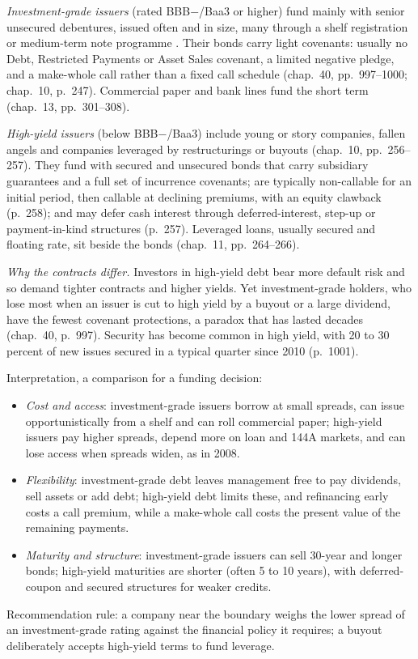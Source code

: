 \begin{qfmethod}\label{meth:corporate-funding-ig-hy}
 \emph{Investment-grade issuers} (rated BBB$-$/Baa3 or higher) fund mainly with senior unsecured debentures, issued often and in size, many through a shelf registration or medium-term note programme \citep[chap.~10, pp.~252 and~259--260]{s7-fabozzifixed}. Their bonds carry light covenants: usually no Debt, Restricted Payments or Asset Sales covenant, a limited negative pledge, and a make-whole call rather than a fixed call schedule (chap.~40, pp.~997--1000; chap.~10, p.~247). Commercial paper and bank lines fund the short term (chap.~13, pp.~301--308).

\emph{High-yield issuers} (below BBB$-$/Baa3) include young or story companies, fallen angels and companies leveraged by restructurings or buyouts (chap.~10, pp.~256--257). They fund with secured and unsecured bonds that carry subsidiary guarantees and a full set of incurrence covenants; are typically non-callable for an initial period, then callable at declining premiums, with an equity clawback (p.~258); and may defer cash interest through deferred-interest, step-up or payment-in-kind structures (p.~257). Leveraged loans, usually secured and floating rate, sit beside the bonds (chap.~11, pp.~264--266).

 \emph{Why the contracts differ.} Investors in high-yield debt bear more default risk and so demand tighter contracts and higher yields. Yet investment-grade holders, who lose most when an issuer is cut to high yield by a buyout or a large dividend, have the fewest covenant protections, a paradox that has lasted decades (chap.~40, p.~997). Security has become common in high yield, with 20 to 30 percent of new issues secured in a typical quarter since 2010 (p.~1001).

 Interpretation, a comparison for a funding decision:
\begin{itemize}
\item \emph{Cost and access}: investment-grade issuers borrow at small spreads, can issue opportunistically from a shelf and can roll commercial paper; high-yield issuers pay higher spreads, depend more on loan and 144A markets, and can lose access when spreads widen, as in 2008.
\item \emph{Flexibility}: investment-grade debt leaves management free to pay dividends, sell assets or add debt; high-yield debt limits these, and refinancing early costs a call premium, while a make-whole call costs the present value of the remaining payments.
\item \emph{Maturity and structure}: investment-grade issuers can sell 30-year and longer bonds; high-yield maturities are shorter (often 5 to 10 years), with deferred-coupon and secured structures for weaker credits.
\end{itemize}
Recommendation rule: a company near the boundary weighs the lower spread of an investment-grade rating against the financial policy it requires; a buyout deliberately accepts high-yield terms to fund leverage.


\end{qfmethod}
